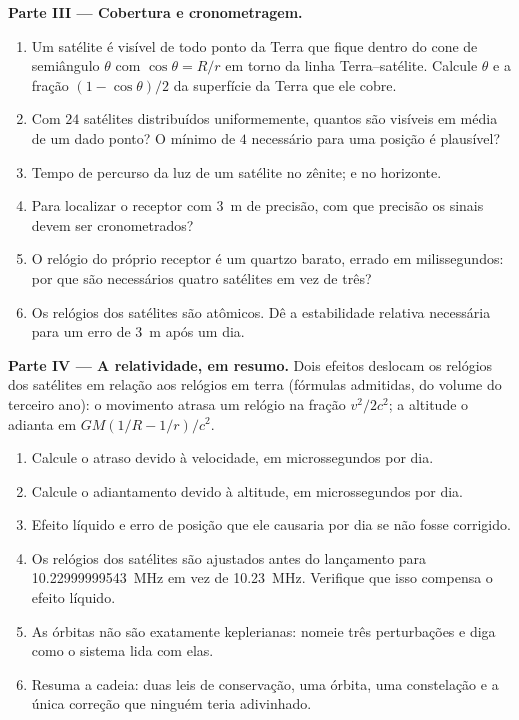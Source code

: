 \begin{problem}
\medskip
\noindent\textbf{Parte III --- Cobertura e cronometragem.}
\begin{enumerate}[resume]
  \item Um satélite é visível de todo ponto da Terra que fique
        dentro do cone de semiângulo $\theta$ com $\cos\theta = R/r$
        em torno da linha Terra--satélite. Calcule $\theta$ e a
        fração $(1 - \cos\theta)/2$ da superfície da Terra que ele cobre.
  \item Com $24$ satélites distribuídos uniformemente, quantos são visíveis em
        média de um dado ponto? O mínimo de $4$ necessário para uma posição é
        plausível?
  \item Tempo de percurso da luz de um satélite no zênite; e no
        horizonte.
  \item Para localizar o receptor com \qty{3}{m} de precisão, com que precisão os
        sinais devem ser cronometrados?
  \item O relógio do próprio receptor é um quartzo barato, errado em
        milissegundos: por que são necessários quatro satélites em vez de três?
  \item Os relógios dos satélites são atômicos. Dê a estabilidade relativa
        necessária para um erro de \qty{3}{m} após um dia.
\end{enumerate}

\medskip
\noindent\textbf{Parte IV --- A relatividade, em resumo.}
Dois efeitos deslocam os relógios dos satélites em relação aos relógios em terra
(fórmulas admitidas, do volume do terceiro ano): o movimento atrasa um relógio na
fração $v^2/2c^2$; a altitude o adianta em $GM(1/R - 1/r)/c^2$.
\begin{enumerate}[resume]
  \item Calcule o atraso devido à velocidade, em microssegundos por dia.
  \item Calcule o adiantamento devido à altitude, em microssegundos por
        dia.
  \item Efeito líquido e erro de posição que ele causaria por dia se não
        fosse corrigido.
  \item Os relógios dos satélites são ajustados antes do lançamento para
        \qty{10.22999999543}{MHz} em vez de \qty{10.23}{MHz}. Verifique que
        isso compensa o efeito líquido.
  \item As órbitas não são exatamente keplerianas: nomeie três perturbações
        e diga como o sistema lida com elas.
  \item Resuma a cadeia: duas leis de conservação, uma órbita, uma
        constelação e a única correção que ninguém teria adivinhado.
\end{enumerate}
\end{problem}
